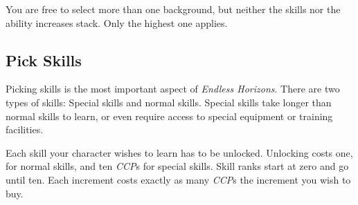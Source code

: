 You are free to select more than one background, but neither the skills nor the
ability increases stack. Only the highest one applies.

\subsection{Pick Skills}

Picking skills is the most important aspect of \emph{Endless Horizons}. There
are two types of skills: Special skills and normal skills. Special skills take
longer than normal skills to learn, or even require access to special equipment
or training facilities.

Each skill your character wishes to learn has to be unlocked. Unlocking costs
one, for normal skills, and ten \emph{CCP}s for special skills. Skill ranks
start at zero and go until ten. Each increment costs exactly as many
\emph{CCP}s the increment you wish to buy.
